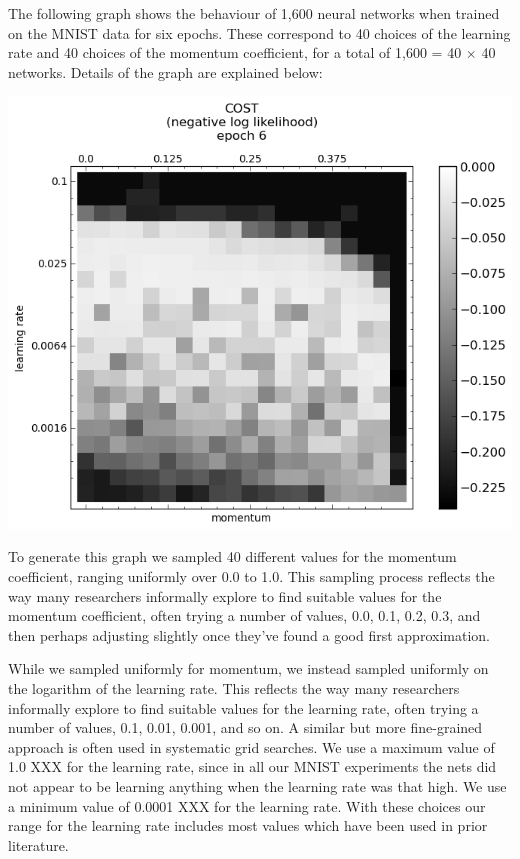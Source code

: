 \documentclass[10pt]{article}
\begin{document}
The following graph shows the behaviour of 1,600 neural networks when
trained on the MNIST data for six epochs. These correspond to 40
choices of the learning rate and 40 choices of the momentum
coefficient, for a total of 1,600 = 40 $\times$ 40 networks.  Details
of the graph are explained below:
%
\begin{center}
\includegraphics[scale=0.5]{plots/detailed/LF-20R10R-20T10-MNIST-6.png}
\end{center}
%
%
%
%
%

To generate this graph we sampled 40 different values for the momentum
coefficient, ranging uniformly over 0.0 to 1.0.  This sampling process
reflects the way many researchers informally explore to find suitable
values for the momentum coefficient, often trying a number of values,
0.0, 0.1, 0.2, 0.3, and then perhaps adjusting slightly once they've
found a good first approximation.

While we sampled uniformly for momentum, we instead sampled uniformly
on the logarithm of the learning rate.  This reflects the way many
researchers informally explore to find suitable values for the
learning rate, often trying a number of values, 0.1, 0.01, 0.001, and
so on.  A similar but more fine-grained approach is often used in
systematic grid searches.  We use a maximum value of 1.0 XXX for the
learning rate, since in all our MNIST experiments the nets did not
appear to be learning anything when the learning rate was that high.
We use a minimum value of 0.0001 XXX for the learning rate.  With
these choices our range for the learning rate includes most values
which have been used in prior literature.
\end{document}
